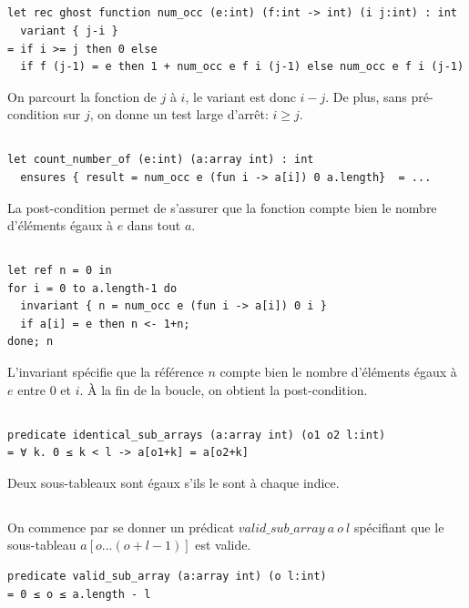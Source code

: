 ﻿\documentclass[10pt,a4paper]{article}
\begin{document}
\subsection{}
\label{q5}
\begin{verbatim}
let rec ghost function num_occ (e:int) (f:int -> int) (i j:int) : int
  variant { j-i }
= if i >= j then 0 else
  if f (j-1) = e then 1 + num_occ e f i (j-1) else num_occ e f i (j-1)
\end{verbatim}
On \og parcourt\fg{} la fonction de $j$ à $i$, le variant est donc $i-j$. De plus, sans pré-condition sur $j$, on donne un test large d'arrêt: $ i \geq j$.

\subsection{}
\begin{verbatim}
let count_number_of (e:int) (a:array int) : int
  ensures { result = num_occ e (fun i -> a[i]) 0 a.length}  = ...
\end{verbatim}
La post-condition permet de s'assurer que la fonction compte bien le nombre d'éléments égaux à $e$ dans tout $a$.

\subsection{}
\begin{verbatim}
let ref n = 0 in
for i = 0 to a.length-1 do
  invariant { n = num_occ e (fun i -> a[i]) 0 i }
  if a[i] = e then n <- 1+n;
done; n
\end{verbatim}
L'invariant spécifie que la référence $n$ compte bien le nombre d'éléments égaux à $e$ entre $0$ et $i$. À la fin de la boucle, on obtient la post-condition.

\subsection{}
\begin{verbatim}
predicate identical_sub_arrays (a:array int) (o1 o2 l:int)
= ∀ k. 0 ≤ k < l -> a[o1+k] = a[o2+k]
\end{verbatim}
Deux sous-tableaux sont égaux s'ils le sont à chaque indice.

\subsection{}
On commence par se donner un prédicat $valid\_sub\_array\ a\ o\ l$ spécifiant que le sous-tableau $a[o... (o+l-1)]$ est valide.
\begin{verbatim}
predicate valid_sub_array (a:array int) (o l:int)
= 0 ≤ o ≤ a.length - l
\end{verbatim}
\end{document}
